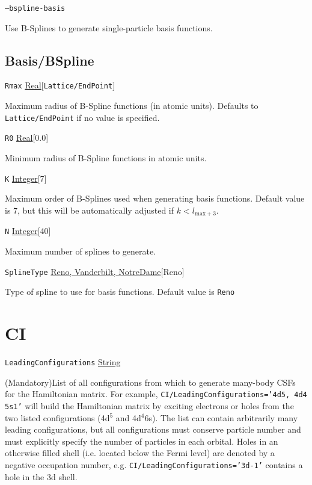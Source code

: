\documentclass{report}
\begin{document}
\texttt{--bspline-basis} 
\begin{adjustwidth}{1cm}{}
Use B-Splines to generate single-particle basis functions.
\end{adjustwidth}

\subsection{Basis/BSpline}

\texttt{Rmax} \uline{Real}[\texttt{Lattice/EndPoint}]
\begin{adjustwidth}{1cm}{}
Maximum radius of B-Spline functions (in atomic units). Defaults to \texttt{Lattice/EndPoint} if no 
value is specified.
\end{adjustwidth}

\texttt{R0} \uline{Real}[0.0]
\begin{adjustwidth}{1cm}{}
Minimum radius of B-Spline functions in atomic units. 
\end{adjustwidth}

\texttt{K} \uline{Integer}[7]
\begin{adjustwidth}{1cm}{}
Maximum order of B-Splines used when generating basis functions. Default value is 7, but this will be
automatically adjusted if $k < l_{\mathrm{max} + 3}$.
\end{adjustwidth}

\texttt{N} \uline{Integer}[40]
\begin{adjustwidth}{1cm}{}
Maximum number of splines to generate.
\end{adjustwidth}

\texttt{SplineType} \uline{Reno, Vanderbilt, NotreDame}[Reno]
\begin{adjustwidth}{1cm}{}
Type of spline to use for basis functions. Default value is \texttt{Reno}
\end{adjustwidth}

\section{CI}

\texttt{LeadingConfigurations} \uline{String}
\begin{adjustwidth}{1cm}{}
(Mandatory)List of all configurations from which to generate many-body CSFs for the 
Hamiltonian matrix. For example, \texttt{CI/LeadingConfigurations='4d5, 4d4 5s1'} will build the 
Hamiltonian matrix by exciting electrons or holes from the two listed configurations (4d$^5$ and 
4d$^4$6s). The list can contain arbitrarily many leading configurations, but all configurations must 
conserve particle number and must explicitly specify the number of particles in each orbital. Holes in 
an otherwise filled shell (i.e. located below the Fermi level) are denoted by a negative occupation 
number, e.g. \texttt{CI/LeadingConfigurations='3d-1'} contains a hole in the 3d shell.
\end{adjustwidth}
\end{document}
